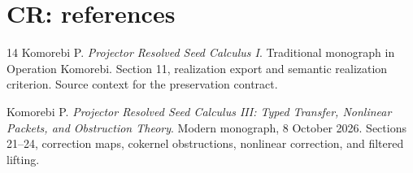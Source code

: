 \documentclass[11pt,oneside,openany]{book}
\numberwithin{equation}{section}
\begin{document}
\chapter{CR: references}
\begin{thebibliography}{14}
Komorebi P. \emph{Projector Resolved Seed Calculus I}. Traditional monograph in Operation Komorebi. Section 11, realization export and semantic realization criterion. Source context for the preservation contract.

Komorebi P. \emph{Projector Resolved Seed Calculus III: Typed Transfer, Nonlinear Packets, and Obstruction Theory}. Modern monograph, 8 October 2026. Sections 21--24, correction maps, cokernel obstructions, nonlinear correction, and filtered lifting.

\end{thebibliography}
\end{document}
